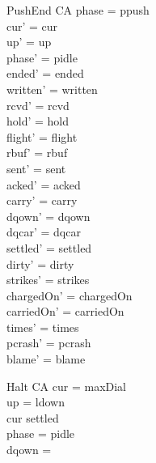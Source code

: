 \documentclass[a4paper,10pt,fleqn]{article}
\begin{document}
\begin{schema}{PushEnd}
  \Delta CA
\where
  phase = ppush \\
  cur' = cur \\
  up' = up \\
  phase' = pidle \\
  ended' = ended \\
  written' = written \\
  rcvd' = rcvd \\
  hold' = hold \\
  flight' = flight \\
  rbuf' = rbuf \\
  sent' = sent \\
  acked' = acked \\
  carry' = carry \\
  dqown' = dqown \\
  dqcar' = dqcar \\
  settled' = settled \\
  dirty' = dirty \\
  strikes' = strikes \\
  chargedOn' = chargedOn \\
  carriedOn' = carriedOn \\
  times' = times \\
  pcrash' = pcrash \\
  blame' = blame
\end{schema}

\begin{schema}{Halt}
  \Xi CA
\where
  cur = maxDial \\
  up = ldown \\
  cur \in settled \\
  phase = pidle \\
  dqown = \emptyset
\end{schema}
\end{document}
